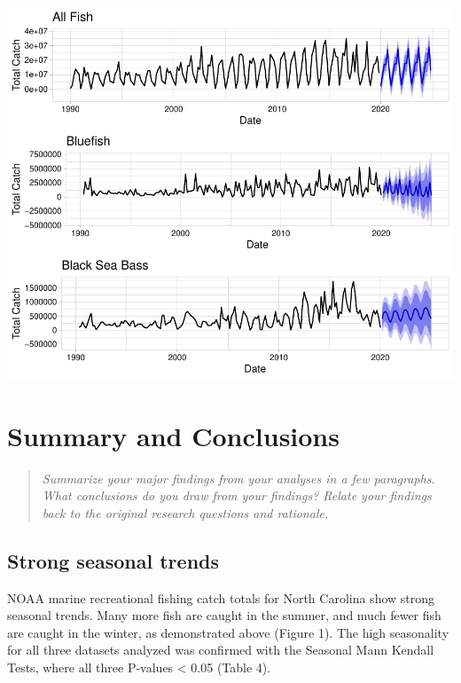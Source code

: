 \documentclass[
  12pt,
]{article}
\begin{document}
\begin{flushright}\includegraphics{Report_FishTrends_files/figure-latex/unnamed-chunk-1-1} \end{flushright}

\newpage

\hypertarget{summary-and-conclusions}{%
\section{Summary and Conclusions}\label{summary-and-conclusions}}

\begin{quote}
\emph{Summarize your major findings from your analyses in a few
paragraphs. What conclusions do you draw from your findings? Relate your
findings back to the original research questions and rationale.}
\end{quote}

\hypertarget{strong-seasonal-trends}{%
\subsection{Strong seasonal trends}\label{strong-seasonal-trends}}

NOAA marine recreational fishing catch totals for North Carolina show
strong seasonal trends. Many more fish are caught in the summer, and
much fewer fish are caught in the winter, as demonstrated above (Figure
1). The high seasonality for all three datasets analyzed was confirmed
with the Seasonal Mann Kendall Tests, where all three P-values
\textless{} 0.05 (Table 4).
\end{document}

